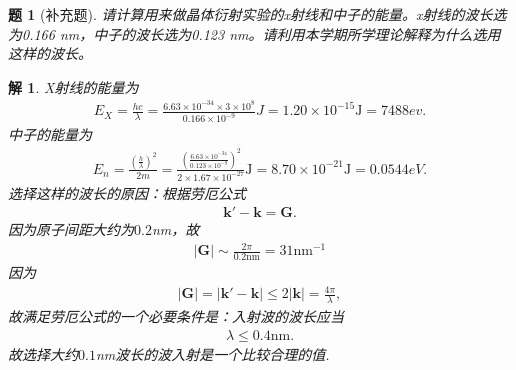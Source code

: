 \documentclass[UTF8,10pt,a4paper]{article}
\theoremstyle{Problem}
\newtheorem{prob}{题}
\theoremstyle{Solution}
\newtheorem*{sol}{解}
\providecommand{\abs}[1]{\left\lvert#1\right\rvert}
\begin{document}
\begin{prob}[补充题]
    请计算用来做晶体衍射实验的x射线和中子的能量。x射线的波长选为0.166 nm，中子的波长选为0.123 nm。请利用本学期所学理论解释为什么选用这样的波长。
\end{prob}
\begin{sol}
    X射线的能量为
    \begin{align}
        E_X=\frac{hc}{\lambda}=\frac{6.63\times 10^{-34}\times 3\times 10^8}{0.166\times 10^{-9}}J=1.20\times 10^{-15}\text{J}=7488ev.
    \end{align}
    中子的能量为
    \begin{align}
        E_n=\frac{\left(\frac{h}{\lambda}\right)^2}{2m}=\frac{\left(\frac{6.63\times 10^{-34}}{0.123\times 10^{-9}}\right)^2}{2\times 1.67\times 10^{-27}}\text{J}=8.70\times 10^{-21}\text{J}=0.0544eV.
    \end{align}
    选择这样的波长的原因：根据劳厄公式
    \begin{align}
        \bm{k}'-\bm{k}=\bm{G}.
    \end{align}
    因为原子间距大约为$0.2$nm，故
    \begin{align}
        \abs{\bm{G}}\sim\frac{2\pi}{0.2\text{nm}}=31\text{nm}^{-1}
    \end{align}
    因为
    \begin{align}
        \abs{\bm{G}}=\abs{\bm{k}'-\bm{k}}\leq 2\abs{\bm{k}}=\frac{4\pi}{\lambda},
    \end{align}
    故满足劳厄公式的一个必要条件是：入射波的波长应当
    \begin{align}
        \lambda\leq 0.4\text{nm}.
    \end{align}
    故选择大约$0.1$nm波长的波入射是一个比较合理的值.
\end{sol}
\end{document}
